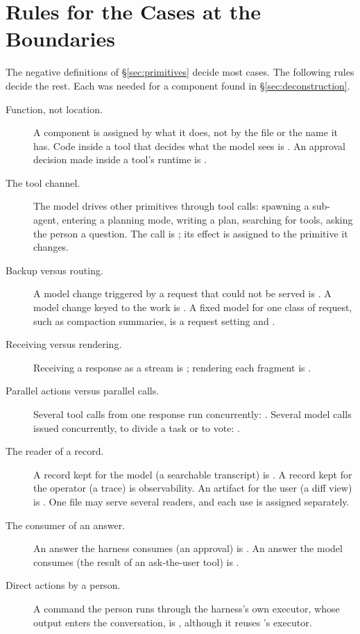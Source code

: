 \section{Rules for the Cases at the Boundaries}
\label{app:rules}
The negative definitions of \S\ref{sec:primitives} decide most cases. The following rules decide the rest. Each was needed for a component found in \S\ref{sec:deconstruction}.

\begin{description}
  \item[Function, not location.] A component is assigned by what it does, not by the file or the name it has. Code inside a tool that decides what the model sees is . An approval decision made inside a tool's runtime is .
  \item[The tool channel.] The model drives other primitives through tool calls: spawning a sub-agent, entering a planning mode, writing a plan, searching for tools, asking the person a question. The call is ; its effect is assigned to the primitive it changes.
  \item[Backup versus routing.] A model change triggered by a request that could not be served is . A model change keyed to the work is . A fixed model for one class of request, such as compaction summaries, is a request setting and .
  \item[Receiving versus rendering.] Receiving a response as a stream is ; rendering each fragment is .
  \item[Parallel actions versus parallel calls.] Several tool calls from one response run concurrently: . Several model calls issued concurrently, to divide a task or to vote: .
  \item[The reader of a record.] A record kept for the model (a searchable transcript) is . A record kept for the operator (a trace) is observability. An artifact for the user (a diff view) is . One file may serve several readers, and each use is assigned separately.
  \item[The consumer of an answer.] An answer the harness consumes (an approval) is . An answer the model consumes (the result of an ask-the-user tool) is .
  \item[Direct actions by a person.] A command the person runs through the harness's own executor, whose output enters the conversation, is , although it reuses 's executor.

\end{description}
